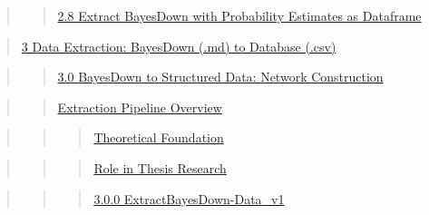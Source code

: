 \documentclass[
  11pt,
  letterpaper,
]{book}
\begin{document}
\begin{quote}
\begin{quote}
\hyperref[scrollTo=19KDn2mKf309ux26uniqifier=1]{2.8 Extract BayesDown
with Probability Estimates as Dataframe}
\end{quote}
\end{quote}

\begin{quote}
\hyperref[scrollTo=Dh4ZEaAnxzIJux26uniqifier=1]{3 Data Extraction:
BayesDown (.md) to Database (.csv)}
\end{quote}

\begin{quote}
\begin{quote}
\hyperref[scrollTo=vUSS00TCEpeWux26uniqifier=1]{3.0 BayesDown to
Structured Data: Network Construction}
\end{quote}
\end{quote}

\begin{quote}
\begin{quote}
\hyperref[scrollTo=vUSS00TCEpeWux26uniqifier=1]{Extraction Pipeline
Overview}
\end{quote}
\end{quote}

\begin{quote}
\begin{quote}
\begin{quote}
\hyperref[scrollTo=vUSS00TCEpeWux26uniqifier=1]{Theoretical Foundation}
\end{quote}
\end{quote}
\end{quote}

\begin{quote}
\begin{quote}
\begin{quote}
\hyperref[scrollTo=vUSS00TCEpeWux26uniqifier=1]{Role in Thesis Research}
\end{quote}
\end{quote}
\end{quote}

\begin{quote}
\begin{quote}
\begin{quote}
\hyperref[scrollTo=AFnu_1Ludahiux26uniqifier=1]{3.0.0
ExtractBayesDown-Data\_v1}
\end{quote}
\end{quote}
\end{quote}
\end{document}
